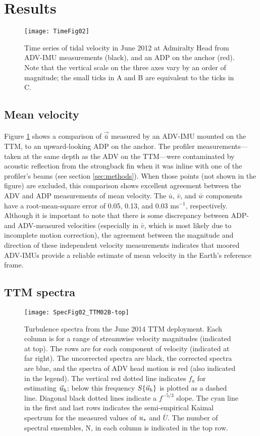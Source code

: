 \section{Results}
\label{sec:results}

\begin{figure}[t]
  \centering
  \texttt{[image: TimeFig02]}
  \caption{Time series of tidal velocity in June 2012 at Admiralty Head from ADV-IMU measurements (black), and an ADP on the anchor (red). Note that the vertical scale on the three axes vary by an order of magnitude; the small ticks in A and B are equivalent to the ticks in C.}
  \label{fig:vel_time}
\end{figure}

\subsection{Mean velocity}

Figure \ref{fig:vel_time} shows a comparison of $\vec{\bar u}$ measured by an ADV-IMU mounted on the TTM, to an upward-looking ADP on the anchor. The profiler measurements---taken at the same depth as the ADV on the TTM---were contaminated by acoustic reflection from the strongback fin when it was inline with one of the profiler's beams (see section \ref{sec:methods}). When those points (not shown in the figure) are excluded, this comparison shows excellent agreement between the ADV and ADP measurements of mean velocity. The $\bar u$, $\bar v$, and $\bar w$ components have a root-mean-square error of 0.05, 0.13, and 0.03 ms$^{-1}$, respectively. Although it is important to note that there is some discrepancy between ADP- and ADV-measured velocities (especially in $\bar v$, which is most likely due to incomplete motion correction), the agreement between the magnitude and direction of these independent velocity measurements indicates that moored ADV-IMUs provide a reliable estimate of mean velocity in the Earth's reference frame.

\subsection{TTM spectra}

\begin{figure*}[t]
  \centering
  \texttt{[image: SpecFig02\_TTM02B-top]}
  \caption{Turbulence spectra from the June 2014 TTM deployment. Each column is for a range of streamwise velocity magnitudes (indicated at top). The rows are for each component of velocity (indicated at far right). The uncorrected spectra are black, the corrected spectra are blue, and the spectra of ADV head motion is red (also indicated in the legend). The vertical red dotted line indicates $f_a$ for estimating $\vec{u}_{\mathrm{h}}$; below this frequency $S\{\vec{u}_{\mathrm{h}}\}$ is plotted as a dashed line.   Diagonal black dotted lines indicate a $f^{-5/3}$ slope. The cyan line in the first and last rows indicates the semi-empirical Kaimal spectrum for the measured values of $u_*$ and $\bar U$. The number of spectral ensembles, N, in each column is indicated in the top row.}
  \label{fig:spec:ttm}
\end{figure*}

